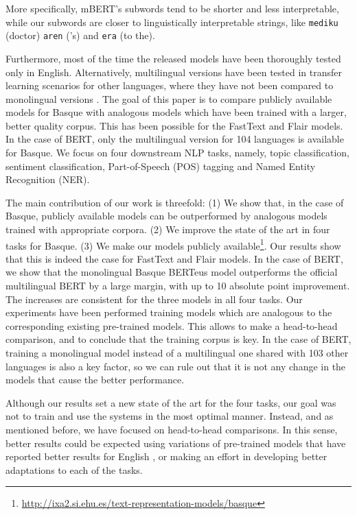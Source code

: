 \documentclass[10pt, a4paper]{article}
\begin{document}
More specifically, mBERT's subwords tend to be shorter and less interpretable, while our subwords are closer to linguistically interpretable strings, like \texttt{mediku} (doctor) \texttt{aren} ('s) and \texttt{era} (to the).

Furthermore, most of the time the released models have been thoroughly tested only in English. Alternatively, multilingual versions have been tested in transfer learning scenarios for other languages, where they have not been compared to monolingual versions \cite{devlin2019bert}.
The goal of this paper is to compare publicly available models for Basque with analogous models which have been trained with a larger, better quality corpus. This has been possible for the FastText and Flair models. In the case of BERT, only the multilingual version for 104 languages is available for Basque. We focus on four downstream NLP tasks, namely, topic classification, sentiment classification, Part-of-Speech (POS) tagging and Named Entity Recognition (NER).

The main contribution of our work is threefold: (1) We show that, in the case of Basque, publicly available models can be outperformed by analogous models trained with appropriate corpora. (2) We improve the state of the art in four tasks for Basque. (3) We make our models publicly available\footnote{\scriptsize \url{http://ixa2.si.ehu.es/text-representation-models/basque}}. Our results show that this is indeed the case for FastText and Flair models. In the case of BERT, we show that the monolingual Basque BERTeus model outperforms the official multilingual BERT by a large margin, with up to 10 absolute point improvement. The increases are consistent for the three models in all four tasks. Our experiments have been performed training models which are analogous to the corresponding existing pre-trained models. This allows to make a head-to-head comparison, and to conclude that the training corpus is key. In the case of BERT, training a monolingual model instead of a multilingual one shared with 103 other languages is also a key factor, so we can rule out that it is not any change in the models that cause the better performance.

Although our results set a new state of the art for the four tasks, our goal was not to train and use the systems in the most optimal manner. Instead, and as mentioned before, we have focused on head-to-head comparisons. In this sense, better results could be expected using variations of pre-trained models that have reported better results for English \cite{liu2019roberta}, or making an effort in developing better adaptations to each of the tasks.
\end{document}
